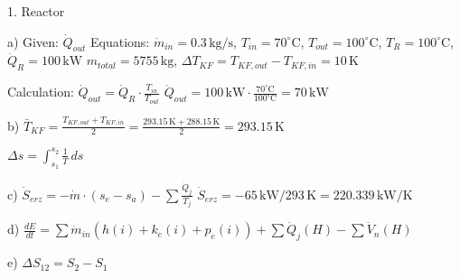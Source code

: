 1. Reactor  

a)  
Given: \( \dot{Q}_{out} \)  
Equations:  
\( \dot{m}_{in} = 0.3 \, \text{kg/s} \), \( T_{in} = 70^\circ \text{C} \), \( T_{out} = 100^\circ \text{C} \), \( T_R = 100^\circ \text{C} \), \( \dot{Q}_R = 100 \, \text{kW} \)  
\( m_{total} = 5755 \, \text{kg} \), \( \Delta T_{KF} = T_{KF,out} - T_{KF,in} = 10 \, \text{K} \)  

Calculation:  
\( \dot{Q}_{out} = \dot{Q}_R \cdot \frac{T_{in}}{T_{out}} \)  
\( \dot{Q}_{out} = 100 \, \text{kW} \cdot \frac{70^\circ \text{C}}{100^\circ \text{C}} = 70 \, \text{kW} \)  

b)  
\( \bar{T}_{KF} = \frac{T_{KF,out} + T_{KF,in}}{2} = \frac{293.15 \, \text{K} + 288.15 \, \text{K}}{2} = 293.15 \, \text{K} \)  

\( \Delta s = \int_{s_1}^{s_2} \frac{1}{T} \, ds \)  

c)  
\( \dot{S}_{erz} = -\dot{m} \cdot (s_e - s_a) - \sum \frac{\dot{Q}_j}{T_j} \)  
\( \dot{S}_{erz} = -65 \, \text{kW} / 293 \, \text{K} = 220.339 \, \text{kW/K} \)  

d)  
\( \frac{dE}{dt} = \sum \dot{m}_{in}(h(i) + k_e(i) + p_e(i)) + \sum \dot{Q}_j(H) - \sum \dot{V}_n(H) \)  

e)  
\( \Delta S_{12} = S_2 - S_1 \)